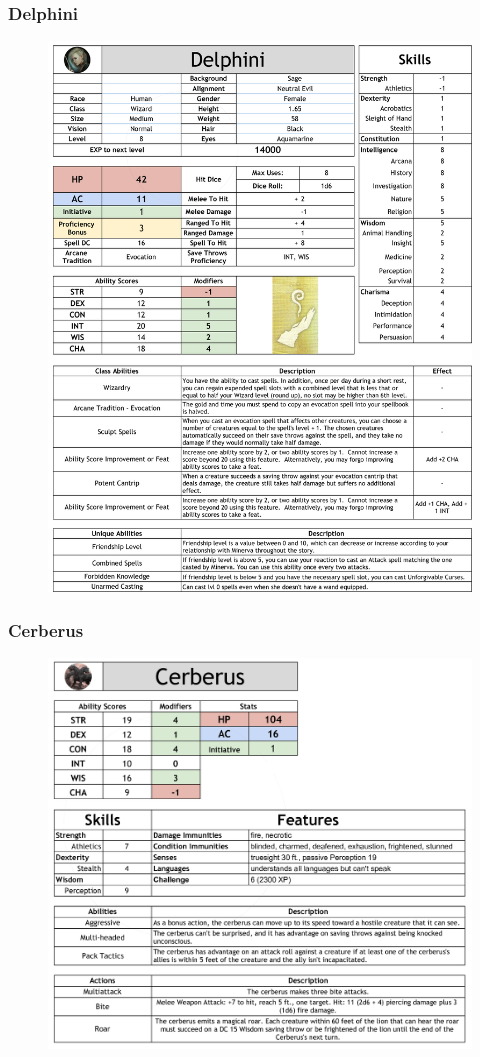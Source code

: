 \subsubsection*{Delphini}
\begin{figure}[H]
\includegraphics[max width=\textwidth]{../Pictures/Characters/Stat_sheets/Delphini_sheet.png}
\end{figure}

\subsubsection*{Cerberus}
\begin{figure}[H]
\includegraphics[max width=\textwidth]{../Pictures/Characters/Stat_sheets/Cerberus_sheet.png}
\end{figure}
